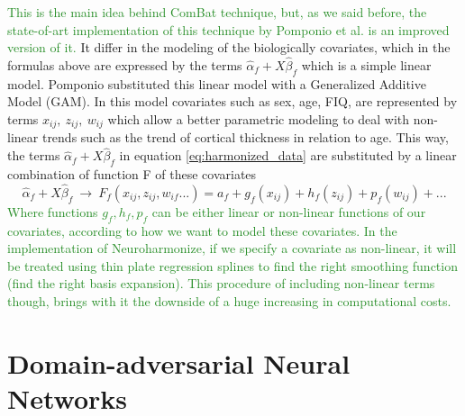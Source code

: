 \documentclass[11pt]{report}
\begin{document}
\textcolor{ForestGreen}{
This is the main idea behind ComBat technique, but, as we said before, the state-of-art implementation of this technique by Pomponio et al. \cite{pomponio-2019} is an improved version of it.
}
It differ in the modeling of the biologically covariates, which in the formulas above are expressed by the terms $\hat \alpha_f + X \hat \beta_f$ which is a simple linear model.
Pomponio substituted this linear model with a Generalized Additive Model (GAM). In this model covariates such as sex, age, FIQ, are represented by terms $x_{ij}, \ z_{ij}, \ w_{ij}$ which allow a better parametric modeling to deal with non-linear trends such as the trend of cortical thickness in relation to age.
This way, the terms $\hat \alpha_f + X \hat \beta_f$ in equation \ref{eq:harmonized_data} are substituted by a linear combination of function F of these covariates
\begin{equation}
\hat \alpha_f + X \hat \beta_f \ \longrightarrow \ F_f(x_{ij}, z_{ij}, w_{if}...) = a_f + g_f(x_{ij}) + h_f(z_{ij}) + p_f(w_{ij}) + ...
\end{equation}
\textcolor{ForestGreen}{
Where functions $g_f, h_f, p_f$ can be either linear or non-linear functions of our covariates, according to how we want to model these covariates.
In the implementation of Neuroharmonize, if we specify a covariate as non-linear, it will be treated using thin plate regression splines to find the right smoothing function (find the right basis expansion).
This procedure of including non-linear terms though, brings with it the downside of a huge increasing in computational costs.
}




\chapter{Domain-adversarial Neural Networks}\label{chap:domain_adversarial_theory}
\end{document}
